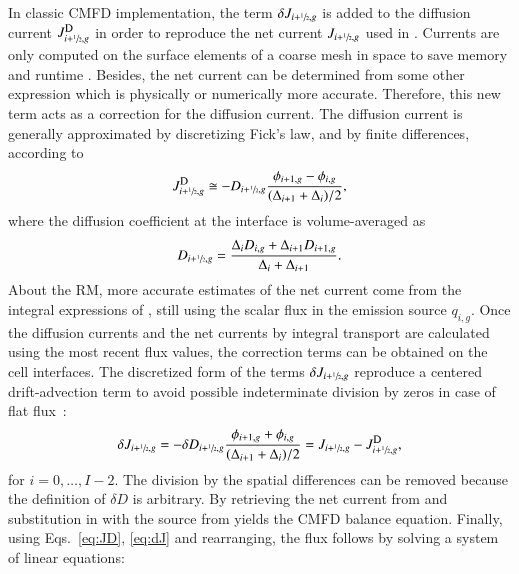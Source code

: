 In classic CMFD implementation, the term $\delta J_{i+\sfrac{1}{2},g}$ is added to the diffusion current $\jD_{i+\hzi,g}$ in order to reproduce the net current $J_{i+\sfrac{1}{2},g}$ used in . Currents are only computed on the surface elements of a coarse mesh in space to save memory and runtime \cite{Smith-1983}. Besides, the net current can be determined from some other expression which is physically or numerically more accurate. Therefore, this new term acts as a correction for the diffusion current. The diffusion current is generally approximated by discretizing Fick's law, and by finite differences, according to
\begin{equation}
  \label{eq:JD}
  \jD_{i+\hzi,g} \cong - D_{i+\hzi,g}
    \frac{\phi_{i+1,g} - \phi_{i,g}}{(\Delta_{i+1} + \Delta_i)/2},
\end{equation}
where the diffusion coefficient at the interface is volume-averaged as
\begin{equation}
  \label{eq:Ds}
  D_{i+\sfrac{1}{2},g} = \frac{\Delta_i D_{i,g} + \Delta_{i+1} D_{i+1,g}}
{\Delta_i + \Delta_{i+1}}.
\end{equation}
%
About the RM, more accurate estimates of the net current come from the integral expressions of , still using the scalar flux in the emission source $q_{i,g}$. %
Once the diffusion currents and the net currents by integral transport are calculated using the most recent flux values, the correction terms can be obtained on the cell interfaces. The discretized form of the terms $\delta J_{i+\sfrac{1}{2},g}$ reproduce a centered drift-advection term to avoid possible indeterminate division by zeros in case of flat flux~\cite{Smith-1983,Tomatis-2011}:
\begin{equation}
  \label{eq:dJ}
  \delta J_{i+\hzi,g} = -\delta D_{i+\hzi,g}
    \frac{\phi_{i+1,g} + \phi_{i,g}}{(\Delta_{i+1} + \Delta_i)/2} =
  J_{i+\hzi,g} - \jD_{i+\hzi,g},
\end{equation}
for $i = 0, \ldots, I-2$. The division by the spatial differences can be removed because the definition of $\delta D$ is arbitrary. By retrieving the net current from  and substitution in  with the source from  yields the CMFD balance equation. Finally, using Eqs.~\eqref{eq:JD}, \eqref{eq:dJ} and rearranging, the flux follows by solving a system of linear equations:
%
